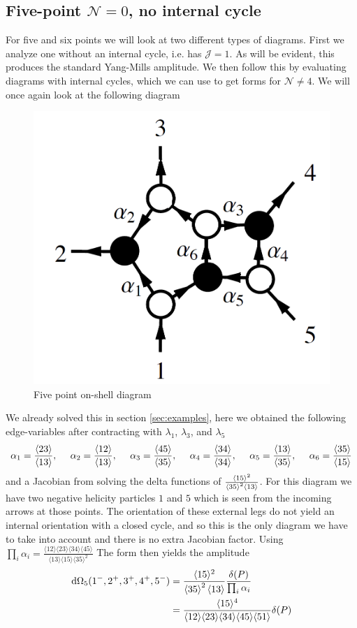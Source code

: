 \documentclass[letter,11pt]{article}
\newcommand{\ab}[1]{\langle #1 \rangle}
\begin{document}
\subsection{Five-point $\mathcal{N}=0$, no internal cycle}
For five and six points we will look at two different types of diagrams. First we analyze one without an internal cycle, i.e. has $\mathcal{J}=1$. As will be evident, this produces  the standard Yang-Mills amplitude. We then follow this by evaluating diagrams with internal cycles, which we can use to get forms for $\mathcal{N}\neq4$.
We will once again look at the following diagram
\begin{figure}[H]
	\centering
	\includegraphics[width=0.3\linewidth]{5pt}
	\caption{Five point on-shell diagram}
	\label{fig:5pt}
\end{figure}
We already solved this in section \ref{sec:examples}, here we obtained the following edge-variables after contracting with $\lambda_1$, $\lambda_3$, and $\lambda_5$
\begin{equation}
	\begin{aligned}
		\alpha_1=\frac{\expval{23}}{\expval{13}},~~~~
		\alpha_2=\frac{\expval{12}}{\expval{13}},~~~~
		\alpha_3=\frac{\expval{45}}{\expval{35}},~~~~
		\alpha_4=\frac{\expval{34}}{\expval{34}},~~~~
		\alpha_5=\frac{\expval{13}}{\expval{35}},~~~~
		\alpha_6=\frac{\expval{35}}{\expval{15}}
	\end{aligned}
\end{equation}
and a Jacobian from solving the delta functions of $\frac{\ab{15}^2}{\expval{35}^2\expval{13}}$. For this diagram we have two negative helicity particles $1$ and $5$ which is seen from the incoming arrows at those points. The orientation of these external legs do not yield an internal orientation with a closed cycle, and so this is the only diagram we have to take into account and there is no extra Jacobian factor. Using $\prod_{i}\alpha_i=\frac{\ab{12}\ab{23}\ab{34}\ab{45}}{\ab{13}\ab{15}\ab{35}^2}$ The form then yields the amplitude
\begin{equation}
	\begin{aligned}
		\dd \Omega_5(1^-,2^+,3^+,4^+,5^-)&=\frac{\ab{15}^2}{\expval{35}^2\expval{13}}\frac{\delta(P)}{\prod_i \alpha_i}\\
		&=\frac{\ab{15}^4}{\ab{12}\ab{23}\ab{34}\ab{45}\ab{51}}\delta(P)
	\end{aligned}
\end{equation}
\end{document}
